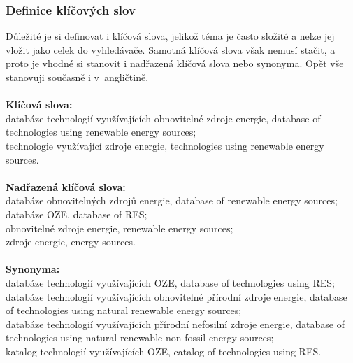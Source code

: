 \documentclass[11pt,a4paper]{article}
\begin{document}
\subsubsection{Definice klíčových slov}
Důležité je si definovat i klíčová slova, jelikož téma je často složité a nelze jej vložit jako celek do vyhledávače.  Samotná klíčová slova však nemusí stačit, a proto je vhodné si stanovit i nadřazená klíčová slova nebo synonyma. Opět vše stanovuji současně i v~angličtině.\\\\
\textbf{Klíčová slova:}\\  
databáze technologií využívajících obnovitelné zdroje energie, database of technologies using renewable energy sources;\\
technologie využívající zdroje energie, technologies using renewable energy sources.\\\\
\textbf{Nadřazená klíčová slova:}\\
databáze obnovitelných zdrojů energie, database of renewable energy sources;\\
databáze OZE, database of RES;\\
obnovitelné zdroje energie, renewable energy sources;\\
zdroje energie, energy sources.\\\\
\textbf{Synonyma:}\\ 
databáze technologií využívajících OZE, database of technologies using RES;\\
databáze technologií využívajících obnovitelné přírodní zdroje energie, database of technologies using natural renewable energy sources;\\
databáze technologií využívajících přírodní nefosilní zdroje energie, database of technologies using natural renewable non-fossil energy sources;\\
katalog technologií využívajících OZE, catalog of technologies using RES.\\
\end{document}
